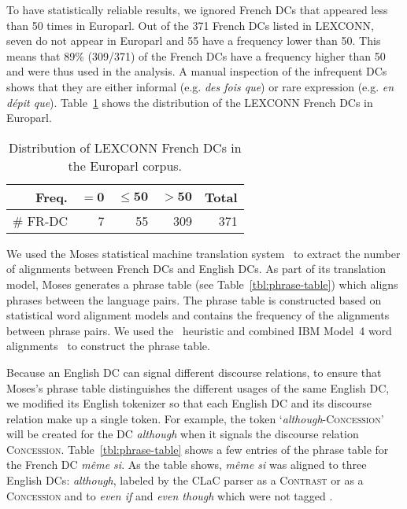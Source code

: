 \documentclass[11pt,a4paper]{article}
\begin{document}

To have statistically reliable results, we ignored French DCs that appeared less than 50 times in Europarl. Out of the 371 French DCs listed in LEXCONN, seven do not appear in Europarl and 55 have a frequency lower than 50. This means that 89\% (309/371) of the French DCs have a frequency higher than 50 and were thus used in the analysis. A manual inspection of the infrequent DCs shows that they are either informal (e.g. \textit{des fois que}) or rare expression (e.g. \textit{en dépit que}).  Table~\ref{tbl:fr-dc-freq} shows the distribution of the LEXCONN French DCs in Europarl.


\begin{table}[ht]
\begin{center}
\begin{tabular}{|r|rrrr|} \hline 
\rowcolor{LightGray}
    \textbf{Freq.}     &   $\mathbf{= 0}$ & $\mathbf{\le 50}$ & $\mathbf{> 50}$ & \textbf{Total} \\ \hline 
    \# FR-DC & 7 & 55 & 309 & 371 \\ \hline
\end{tabular}
\end{center}
\caption[.]{Distribution of LEXCONN French DCs in the Europarl corpus.}
\label{tbl:fr-dc-freq}
\end{table}

We used the Moses statistical machine translation system~\cite{koehn07} to extract the number of alignments between French DCs and English DCs. As part of its translation model, Moses generates a phrase table (see Table~\ref{tbl:phrase-table}) which aligns phrases between the language pairs. The phrase table is constructed based on statistical word alignment models and contains the frequency of the alignments between phrase pairs. We used the~\citet{och03} heuristic and combined IBM Model~4 word alignments~\cite{brown93} to construct the phrase table.

Because an English DC can signal different discourse relations, to ensure that Moses's phrase table distinguishes the different usages of the same English DC, we modified its English tokenizer so that each English DC and its discourse relation make up a single token. For example, the token `\textit{although}\textsc{-Concession}' will be created for the DC \textit{although} when it signals the discourse relation \textsc{Concession}. Table~\ref{tbl:phrase-table} shows a few entries of the phrase table for the French DC \textit{même si}. As the table shows, \textit{même si} was aligned to three English DCs: \textit{although}, labeled by the CLaC parser  as a \textsc{Contrast} or as a \textsc{Concession} and to \textit{even if} and \textit{even though} which were not tagged .
\end{document}
